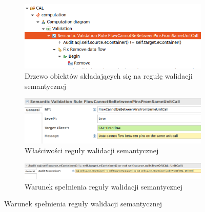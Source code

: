 \begin{figure}[!hb]
	\centering
	\begin{subfigure}{.8\textwidth}
		\centering
		\includegraphics[width=.99\linewidth]{./images/sirius-desktop-example-semantic-validation-rule-tree.png}
		\caption{Drzewo obiektów składających się na regułę walidacji
      semantycznej}\label{rys:sirius-desktop-example-semantic-validation-rule-tree}
	\end{subfigure}

  \medskip

	\begin{subfigure}{.92\textwidth}
		\centering
		\includegraphics[width=.99\linewidth]{./images/sirius-desktop-example-semantic-validation-rule-properties.png}
		\caption{Właściwości reguły walidacji semantycznej}\label{rys:sirius-desktop-example-semantic-validation-rule-properties}
	\end{subfigure}

  \medskip

	\begin{subfigure}{.92\textwidth}
		\centering
		\includegraphics[width=.99\linewidth]{./images/sirius-desktop-example-semantic-validation-rule-audit.png}
		\caption{Warunek spełnienia reguły walidacji semantycznej}\label{rys:sirius-desktop-example-semantic-validation-rule-audit}
	\end{subfigure}


\end{figure}
